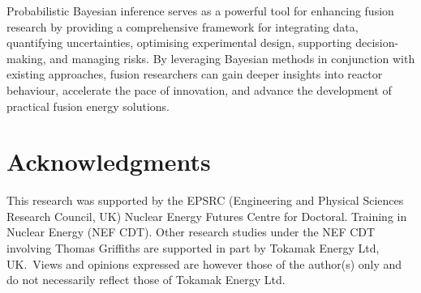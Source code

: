 \documentclass[journal]{IEEEtran}
\begin{document}
Probabilistic Bayesian inference serves as a powerful tool for enhancing fusion research by providing a comprehensive framework for integrating data, quantifying uncertainties, optimising experimental design, supporting decision-making, and managing risks. By leveraging Bayesian methods in conjunction with existing approaches, fusion researchers can gain deeper insights into reactor behaviour, accelerate the pace of innovation, and advance the development of practical fusion energy solutions.

\section{Acknowledgments}
This research was supported by the EPSRC (Engineering and Physical Sciences Research Council, UK) Nuclear Energy Futures Centre for Doctoral. Training in Nuclear Energy (NEF CDT). Other research studies under the NEF CDT involving Thomas Griffiths are supported in part by Tokamak Energy Ltd, UK.\ Views and opinions expressed are however those of the author(s) only and do not necessarily reflect those of Tokamak Energy Ltd.





\begin{appendices}
    
 \end{appendices}
\end{document}

